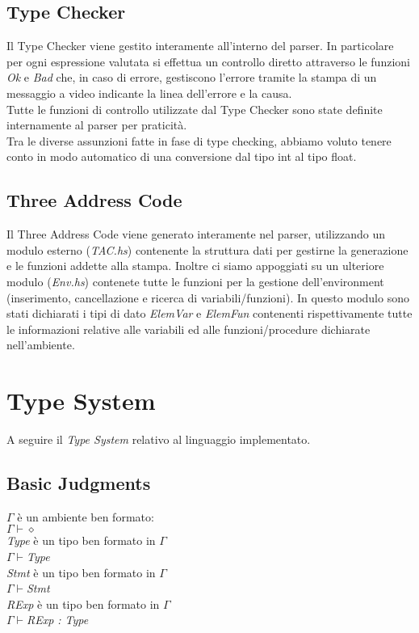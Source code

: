 \documentclass[12pt]{article}
\begin{document}
\subsection{Type Checker}
Il Type Checker viene gestito interamente all'interno del parser. In particolare per ogni espressione valutata si effettua un controllo diretto attraverso le funzioni \textit{Ok} e \textit{Bad} che, in caso di errore, gestiscono l'errore tramite la stampa di un messaggio a video indicante la linea dell'errore e la causa.\\
Tutte le funzioni di controllo utilizzate dal Type Checker sono state definite internamente al parser per praticità.\\
Tra le diverse assunzioni fatte in fase di type checking, abbiamo voluto tenere conto in modo automatico di una conversione dal tipo int al tipo float.

\subsection{Three Address Code}
Il Three Address Code viene generato interamente nel parser, utilizzando un modulo esterno (\textit{TAC.hs}) contenente la struttura dati per gestirne la generazione e le funzioni addette alla stampa. Inoltre ci siamo appoggiati su un ulteriore modulo (\textit{Env.hs}) contenete tutte le funzioni per la gestione dell'environment (inserimento, cancellazione e ricerca di variabili/funzioni).
In questo modulo sono stati dichiarati i tipi di dato \textit{ElemVar} e \textit{ElemFun} contenenti rispettivamente tutte le informazioni relative alle variabili ed alle funzioni/procedure dichiarate nell'ambiente.


\section{Type System}
A seguire il \textit{Type System} relativo al linguaggio implementato.
\subsection*{Basic Judgments}
\begin{center}
$\Gamma$ è un ambiente ben formato:\\
$\Gamma \vdash \diamond$\\[0.1in]
\textit{Type} è un tipo ben formato in $\Gamma$\\
$\Gamma \vdash $\textit{Type}\\[0.1in]
\textit{Stmt} è un tipo ben formato in $\Gamma$\\
$\Gamma \vdash $\textit{Stmt}\\[0.1in]
\textit{RExp} è un tipo ben formato in $\Gamma$\\
$\Gamma \vdash $\textit{RExp : Type}\\[0.1in]
\end{center}
\end{document}
